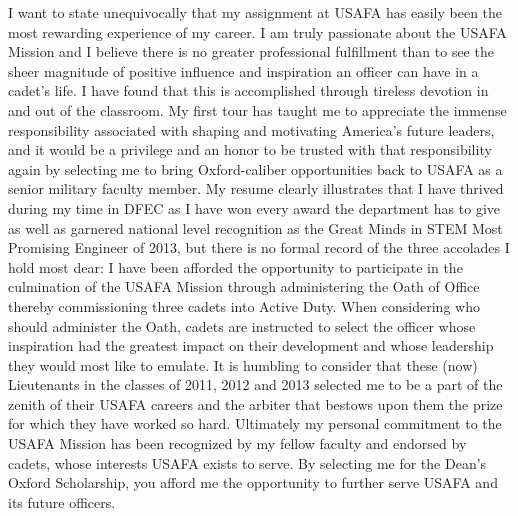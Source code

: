 \documentclass{article}
\begin{document}
I want to state unequivocally that my assignment at USAFA has easily been the
most rewarding experience of my career. I am truly passionate about the USAFA
Mission and I believe there is no greater professional fulfillment than to see
the sheer magnitude of positive influence and inspiration an officer can have
in a cadet's life. I have found that this is accomplished through tireless
devotion in and out of the classroom. My first tour has taught me to appreciate
the immense responsibility associated with shaping and motivating America's
future leaders, and it would be a privilege and an honor to be trusted with
that responsibility again by selecting me to bring Oxford-caliber opportunities
back to USAFA as a senior military faculty member. My resume clearly illustrates that I have thrived during my time in DFEC as I
have won every award the department has to give as well as garnered national
level recognition as the Great Minds in STEM Most Promising Engineer of 2013,
but there is no formal record of the three accolades I hold most dear: I have been
afforded the opportunity to participate in the culmination of the USAFA Mission
through administering the Oath of Office thereby commissioning three cadets into
Active Duty. When considering who should administer the Oath, cadets are
instructed to select the officer whose inspiration had the greatest impact on
their development and whose leadership they would most like to emulate. It is
humbling to consider that these (now) Lieutenants in the classes of 2011, 2012
and 2013 selected me to be a part of the zenith of their USAFA careers and the
arbiter that bestows upon them the prize for which they have worked so hard.
Ultimately my personal commitment to the USAFA Mission has been recognized by
my fellow faculty and endorsed by cadets, whose interests USAFA exists to
serve. By selecting me for the Dean's Oxford Scholarship, you afford me the opportunity
to further serve USAFA and its future officers.

\newpage
\renewcommand\contentsname{Attachments}\tableofcontents
\end{document}
